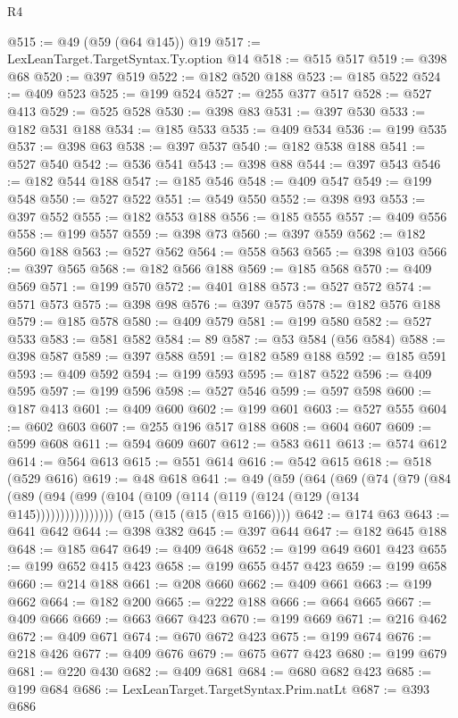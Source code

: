 \begin{lexlean}{R4}
\begin{coremodule}
@515 := @49 (@59 (@64 @145)) @19
@517 := LexLeanTarget.TargetSyntax.Ty.option @14
@518 := @515 @517
@519 := @398 @68
@520 := @397 @519
@522 := @182 @520 @188
@523 := @185 @522
@524 := @409 @523
@525 := @199 @524
@527 := @255 @377 @517
@528 := @527 @413
@529 := @525 @528
@530 := @398 @83
@531 := @397 @530
@533 := @182 @531 @188
@534 := @185 @533
@535 := @409 @534
@536 := @199 @535
@537 := @398 @63
@538 := @397 @537
@540 := @182 @538 @188
@541 := @527 @540
@542 := @536 @541
@543 := @398 @88
@544 := @397 @543
@546 := @182 @544 @188
@547 := @185 @546
@548 := @409 @547
@549 := @199 @548
@550 := @527 @522
@551 := @549 @550
@552 := @398 @93
@553 := @397 @552
@555 := @182 @553 @188
@556 := @185 @555
@557 := @409 @556
@558 := @199 @557
@559 := @398 @73
@560 := @397 @559
@562 := @182 @560 @188
@563 := @527 @562
@564 := @558 @563
@565 := @398 @103
@566 := @397 @565
@568 := @182 @566 @188
@569 := @185 @568
@570 := @409 @569
@571 := @199 @570
@572 := @401 @188
@573 := @527 @572
@574 := @571 @573
@575 := @398 @98
@576 := @397 @575
@578 := @182 @576 @188
@579 := @185 @578
@580 := @409 @579
@581 := @199 @580
@582 := @527 @533
@583 := @581 @582
@584 := 89
@587 := @53 @584 (@56 @584)
@588 := @398 @587
@589 := @397 @588
@591 := @182 @589 @188
@592 := @185 @591
@593 := @409 @592
@594 := @199 @593
@595 := @187 @522
@596 := @409 @595
@597 := @199 @596
@598 := @527 @546
@599 := @597 @598
@600 := @187 @413
@601 := @409 @600
@602 := @199 @601
@603 := @527 @555
@604 := @602 @603
@607 := @255 @196 @517 @188
@608 := @604 @607
@609 := @599 @608
@611 := @594 @609 @607
@612 := @583 @611
@613 := @574 @612
@614 := @564 @613
@615 := @551 @614
@616 := @542 @615
@618 := @518 (@529 @616)
@619 := @48 @618
@641 := @49
    (@59
      (@64
        (@69
          (@74
            (@79 (@84 (@89 (@94 (@99 (@104 (@109 (@114 (@119 (@124 (@129 (@134 @145))))))))))))))))
    (@15 (@15 (@15 (@15 @166))))
@642 := @174 @63
@643 := @641 @642
@644 := @398 @382
@645 := @397 @644
@647 := @182 @645 @188
@648 := @185 @647
@649 := @409 @648
@652 := @199 @649 @601 @423
@655 := @199 @652 @415 @423
@658 := @199 @655 @457 @423
@659 := @199 @658
@660 := @214 @188
@661 := @208 @660
@662 := @409 @661
@663 := @199 @662
@664 := @182 @200
@665 := @222 @188
@666 := @664 @665
@667 := @409 @666
@669 := @663 @667 @423
@670 := @199 @669
@671 := @216 @462
@672 := @409 @671
@674 := @670 @672 @423
@675 := @199 @674
@676 := @218 @426
@677 := @409 @676
@679 := @675 @677 @423
@680 := @199 @679
@681 := @220 @430
@682 := @409 @681
@684 := @680 @682 @423
@685 := @199 @684
@686 := LexLeanTarget.TargetSyntax.Prim.natLt
@687 := @393 @686

\end{coremodule}
\end{lexlean}
